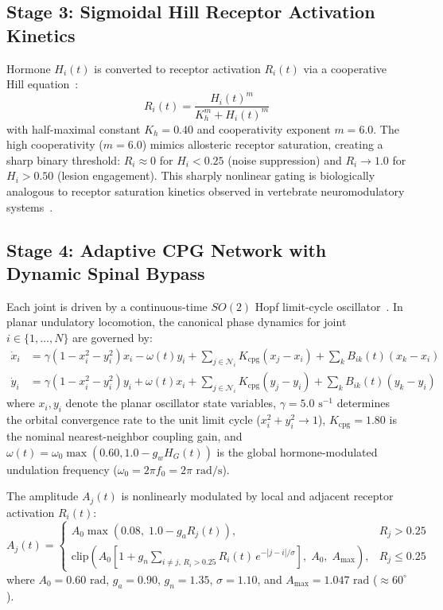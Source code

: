 \documentclass{iopjournal}
\begin{document}
\subsection{Stage 3: Sigmoidal Hill Receptor Activation Kinetics}

Hormone $H_i(t)$ is converted to receptor activation $R_i(t)$ via a cooperative Hill equation~\cite{hill1910}:
\begin{equation}
R_i(t) = \frac{H_i(t)^m}{K_h^m + H_i(t)^m}
\label{eq:hill_receptor}
\end{equation}
with half-maximal constant $K_h = 0.40$ and cooperativity exponent $m = 6.0$. The high cooperativity ($m = 6.0$) mimics allosteric receptor saturation, creating a sharp binary threshold: $R_i \approx 0$ for $H_i < 0.25$ (noise suppression) and $R_i \to 1.0$ for $H_i > 0.50$ (lesion engagement). This sharply nonlinear gating is biologically analogous to receptor saturation kinetics observed in vertebrate neuromodulatory systems~\cite{marder2006}.

\subsection{Stage 4: Adaptive CPG Network with Dynamic Spinal Bypass}

Each joint is driven by a continuous-time $SO(2)$ Hopf limit-cycle oscillator~\cite{manoonpong2007,pasemann2002}. In planar undulatory locomotion, the canonical phase dynamics for joint $i \in \{1, \dots, N\}$ are governed by:
\begin{align}
\dot{x}_i &= \gamma (1 - x_i^2 - y_i^2) x_i - \omega(t) y_i + \sum_{j \in \mathcal{N}_i} K_{\text{cpg}} (x_j - x_i) + \sum_{k} B_{ik}(t) (x_k - x_i) \label{eq:cpg_x} \\
\dot{y}_i &= \gamma (1 - x_i^2 - y_i^2) y_i + \omega(t) x_i + \sum_{j \in \mathcal{N}_i} K_{\text{cpg}} (y_j - y_i) + \sum_{k} B_{ik}(t) (y_k - y_i) \label{eq:cpg_y}
\end{align}
where $x_i, y_i$ denote the planar oscillator state variables, $\gamma = 5.0\text{ s}^{-1}$ determines the orbital convergence rate to the unit limit cycle ($x_i^2 + y_i^2 \to 1$), $K_{\text{cpg}} = 1.80$ is the nominal nearest-neighbor coupling gain, and $\omega(t) = \omega_0 \max(0.60, 1.0 - g_w H_G(t))$ is the global hormone-modulated undulation frequency ($\omega_0 = 2\pi f_0 = 2\pi\text{ rad/s}$).

The amplitude $A_j(t)$ is nonlinearly modulated by local and adjacent receptor activation $R_i(t)$:
\begin{equation}
A_j(t) = \begin{cases}
A_0 \max\!\left(0.08,\; 1.0 - g_a R_j(t)\right), & R_j > 0.25 \\
\mathrm{clip}\!\left(A_0 \left[1 + g_n \sum_{i \neq j,\, R_i > 0.25} R_i(t)\, e^{-|j-i|/\sigma}\right],\; A_0,\; A_{\max}\right), & R_j \le 0.25
\end{cases}
\label{eq:amp_mod}
\end{equation}
where $A_0 = 0.60\text{ rad}$, $g_a = 0.90$, $g_n = 1.35$, $\sigma = 1.10$, and $A_{\max} = 1.047\text{ rad}$ ($\approx 60^\circ$).
\end{document}
